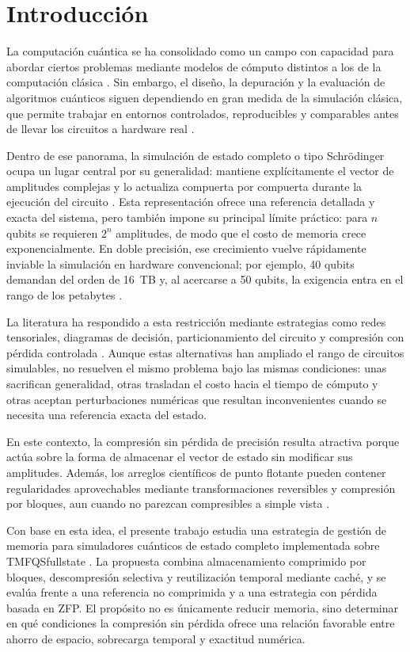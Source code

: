 \section*{Introducción}

La computación cuántica se ha consolidado como un campo con capacidad para abordar ciertos problemas mediante modelos de cómputo distintos a los de la computación clásica \cite{Nielsen2010}. Sin embargo, el diseño, la depuración y la evaluación de algoritmos cuánticos siguen dependiendo en gran medida de la simulación clásica, que permite trabajar en entornos controlados, reproducibles y comparables antes de llevar los circuitos a hardware real \cite{Jones2019,diaz2024software}.

Dentro de ese panorama, la simulación de estado completo o tipo Schr\"odinger ocupa un lugar central por su generalidad: mantiene explícitamente el vector de amplitudes complejas y lo actualiza compuerta por compuerta durante la ejecución del circuito \cite{Jones2019,qiskit_aer_doc}. Esta representación ofrece una referencia detallada y exacta del sistema, pero también impone su principal límite práctico: para $n$ qubits se requieren $2^n$ amplitudes, de modo que el costo de memoria crece exponencialmente. En doble precisión, ese crecimiento vuelve rápidamente inviable la simulación en hardware convencional; por ejemplo, 40 qubits demandan del orden de 16~TB y, al acercarse a 50 qubits, la exigencia entra en el rango de los petabytes \cite{wu2019full,Haner2017}.

La literatura ha respondido a esta restricción mediante estrategias como redes tensoriales, diagramas de decisión, particionamiento del circuito y compresión con pérdida controlada \cite{Vidal2003,Viamontes2003,Chen2018,wu2018amplitude}. Aunque estas alternativas han ampliado el rango de circuitos simulables, no resuelven el mismo problema bajo las mismas condiciones: unas sacrifican generalidad, otras trasladan el costo hacia el tiempo de cómputo y otras aceptan perturbaciones numéricas que resultan inconvenientes cuando se necesita una referencia exacta del estado.

En este contexto, la compresión sin pérdida de precisión resulta atractiva porque actúa sobre la forma de almacenar el vector de estado sin modificar sus amplitudes. Además, los arreglos científicos de punto flotante pueden contener regularidades aprovechables mediante transformaciones reversibles y compresión por bloques, aun cuando no parezcan compresibles a simple vista \cite{burtscher2009fpc,lindstrom2006fpzip,masui2015bitshuffle}.

Con base en esta idea, el presente trabajo estudia una estrategia de gestión de memoria para simuladores cuánticos de estado completo implementada sobre TMFQSfullstate \cite{tmfqs_repo}. La propuesta combina almacenamiento comprimido por bloques, descompresión selectiva y reutilización temporal mediante caché, y se evalúa frente a una referencia no comprimida y a una estrategia con pérdida basada en ZFP. El propósito no es únicamente reducir memoria, sino determinar en qué condiciones la compresión sin pérdida ofrece una relación favorable entre ahorro de espacio, sobrecarga temporal y exactitud numérica.
